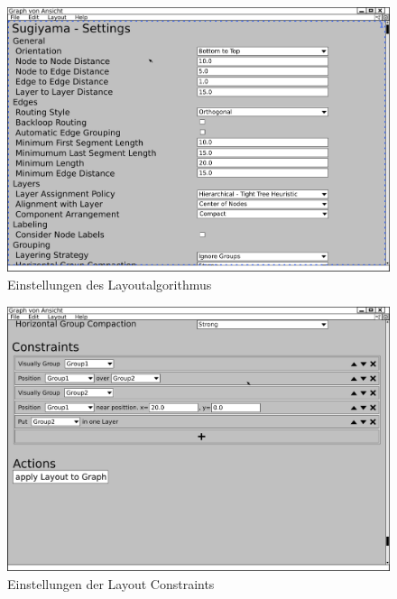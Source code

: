 \begin{figure}[ht]
  \centering
  \includegraphics[width=380pt]{resourcen/gui_layoutsettings_settings.png}
  \caption{Einstellungen des Layoutalgorithmus}
  \label{fig:gui_layoutsettings_settings}
\end{figure}

\begin{figure}[hb]
  \centering
  \includegraphics[width=380pt]{resourcen/gui_layoutsettings_constraints.png}
  \caption{Einstellungen der Layout Constraints}
  \label{fig:gui_layoutsettings_constraints}
\end{figure}

